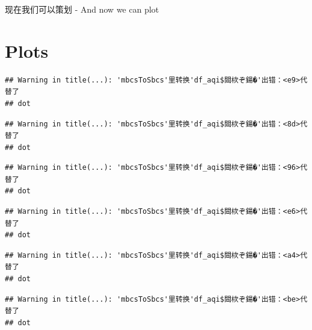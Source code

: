 \documentclass[]{book}
\newenvironment{Shaded}{\begin{snugshade}}{\end{snugshade}}
\newcommand{\DataTypeTok}[1]{\textcolor[rgb]{0.13,0.29,0.53}{#1}}
\newcommand{\DecValTok}[1]{\textcolor[rgb]{0.00,0.00,0.81}{#1}}
\newcommand{\KeywordTok}[1]{\textcolor[rgb]{0.13,0.29,0.53}{\textbf{#1}}}
\newcommand{\NormalTok}[1]{#1}
\newcommand{\OperatorTok}[1]{\textcolor[rgb]{0.81,0.36,0.00}{\textbf{#1}}}
\newcommand{\StringTok}[1]{\textcolor[rgb]{0.31,0.60,0.02}{#1}}
\begin{document}
\begin{Shaded}
\end{Shaded}

现在我们可以策划 - And now we can plot

\hypertarget{plots}{%
\section{Plots}\label{plots}}

\begin{Shaded}
\end{Shaded}

\begin{verbatim}
## Warning in title(...): 'mbcsToSbcs'里转换'df_aqi$閸栨ぞ鍚�'出错：<e9>代替了
## dot
\end{verbatim}

\begin{verbatim}
## Warning in title(...): 'mbcsToSbcs'里转换'df_aqi$閸栨ぞ鍚�'出错：<8d>代替了
## dot
\end{verbatim}

\begin{verbatim}
## Warning in title(...): 'mbcsToSbcs'里转换'df_aqi$閸栨ぞ鍚�'出错：<96>代替了
## dot
\end{verbatim}

\begin{verbatim}
## Warning in title(...): 'mbcsToSbcs'里转换'df_aqi$閸栨ぞ鍚�'出错：<e6>代替了
## dot
\end{verbatim}

\begin{verbatim}
## Warning in title(...): 'mbcsToSbcs'里转换'df_aqi$閸栨ぞ鍚�'出错：<a4>代替了
## dot
\end{verbatim}

\begin{verbatim}
## Warning in title(...): 'mbcsToSbcs'里转换'df_aqi$閸栨ぞ鍚�'出错：<be>代替了
## dot
\end{verbatim}
\end{document}
